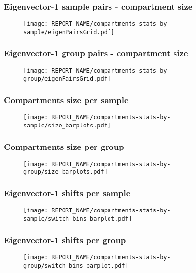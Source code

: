 \documentclass{beamer}
\begin{document}

\begin{frame}
\frametitle{Eigenvector-1 sample pairs - compartment size}
\begin{figure}
\texttt{[image: REPORT\_NAME/compartments-stats-by-sample/eigenPairsGrid.pdf]}
\end{figure}
\end{frame}


\begin{frame}
\frametitle{Eigenvector-1 group pairs - compartment size}
\begin{figure}
\texttt{[image: REPORT\_NAME/compartments-stats-by-group/eigenPairsGrid.pdf]}
\end{figure}
\end{frame}


\begin{frame}
\frametitle{Compartments size per sample}
\begin{figure}
\texttt{[image: REPORT\_NAME/compartments-stats-by-sample/size\_barplots.pdf]}
\end{figure}
\end{frame}


\begin{frame}
\frametitle{Compartments size per group}
\begin{figure}
\texttt{[image: REPORT\_NAME/compartments-stats-by-group/size\_barplots.pdf]}
\end{figure}
\end{frame}


\begin{frame}
\frametitle{Eigenvector-1 shifts per sample}
\begin{figure}
\texttt{[image: REPORT\_NAME/compartments-stats-by-sample/switch\_bins\_barplot.pdf]}
\end{figure}
\end{frame}


\begin{frame}
\frametitle{Eigenvector-1 shifts per group}
\begin{figure}
\texttt{[image: REPORT\_NAME/compartments-stats-by-group/switch\_bins\_barplot.pdf]}
\end{figure}
\end{frame}
\end{document}
